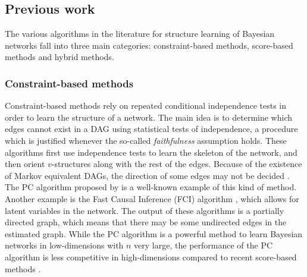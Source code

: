 \documentclass[article]{jss}
\renewcommand{\|}{\,|\,}
\begin{document}
\subsection{Previous work}
\label{subsec:previouswork}

The various algorithms in the literature for structure learning of Bayesian networks fall into three main categories: constraint-based methods, score-based methods and hybrid methods. 

\subsubsection{Constraint-based methods} 
Constraint-based methods rely on repeated conditional independence tests in order to learn the structure of a network. The main idea is to determine which edges cannot exist in a DAG using statistical tests of independence, a procedure which is justified whenever the so-called \emph{faithfulness} assumption holds. These algorithms first use independence tests to learn the skeleton of the network, and then orient $v$-structures along with the rest of the edges. Because of the existence of Markov equivalent DAGs, the direction of some edges may not be decided \citep[for details, see e.g.,][]{koller2009}. The PC algorithm proposed by \citet{spirtes1991} is a well-known example of this kind of method. Another example is the Fast Causal Inference (FCI) algorithm \citep{spirtes2000,colombo2012}, which allows for latent variables in the network. The output of these algorithms is a partially directed graph, which means that there may be some undirected edges in the estimated graph. While the PC algorithm is a powerful method to learn Bayesian networks in low-dimensions with $n$ very large, the performance of the PC algorithm is less competitive in high-dimensions compared to recent score-based methods \citep{aragam2015}.
\end{document}
